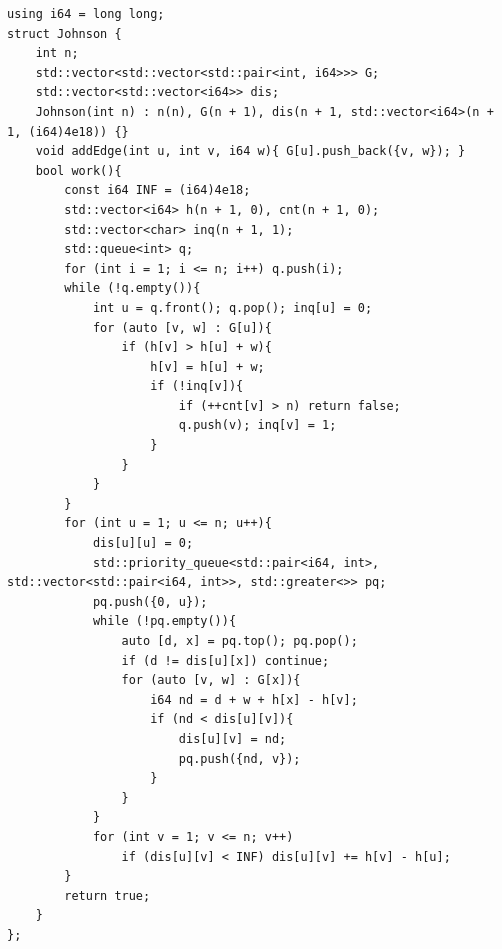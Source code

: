 \begin{lstlisting}
using i64 = long long;
struct Johnson {
    int n;
    std::vector<std::vector<std::pair<int, i64>>> G;
    std::vector<std::vector<i64>> dis;
    Johnson(int n) : n(n), G(n + 1), dis(n + 1, std::vector<i64>(n + 1, (i64)4e18)) {}
    void addEdge(int u, int v, i64 w){ G[u].push_back({v, w}); }
    bool work(){
        const i64 INF = (i64)4e18;
        std::vector<i64> h(n + 1, 0), cnt(n + 1, 0);
        std::vector<char> inq(n + 1, 1);
        std::queue<int> q;
        for (int i = 1; i <= n; i++) q.push(i);
        while (!q.empty()){
            int u = q.front(); q.pop(); inq[u] = 0;
            for (auto [v, w] : G[u]){
                if (h[v] > h[u] + w){
                    h[v] = h[u] + w;
                    if (!inq[v]){
                        if (++cnt[v] > n) return false;
                        q.push(v); inq[v] = 1;
                    }
                }
            }
        }
        for (int u = 1; u <= n; u++){
            dis[u][u] = 0;
            std::priority_queue<std::pair<i64, int>, std::vector<std::pair<i64, int>>, std::greater<>> pq;
            pq.push({0, u});
            while (!pq.empty()){
                auto [d, x] = pq.top(); pq.pop();
                if (d != dis[u][x]) continue;
                for (auto [v, w] : G[x]){
                    i64 nd = d + w + h[x] - h[v];
                    if (nd < dis[u][v]){
                        dis[u][v] = nd;
                        pq.push({nd, v});
                    }
                }
            }
            for (int v = 1; v <= n; v++)
                if (dis[u][v] < INF) dis[u][v] += h[v] - h[u];
        }
        return true;
    }
};
\end{lstlisting}
